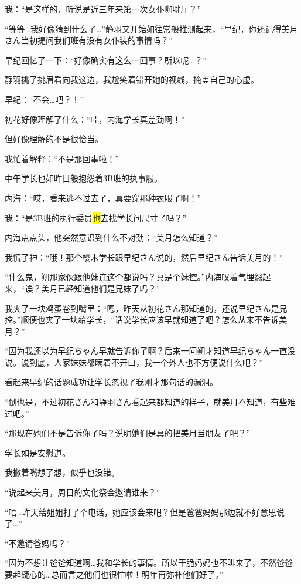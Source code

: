 我：“是这样的，听说是近三年来第一次女仆咖啡厅？”

“等等…我好像猜到什么了…”静羽又开始如往常般推测起来，“早纪，你还记得美月さん当初提问我们班有没有女仆装的事情吗？”

早纪回忆了一下：“好像确实有这么一回事？所以呢…？”

静羽挑了挑眉看向我这边，我尬笑着错开她的视线，掩盖自己的心虚。

早纪：“不会…吧？！”

初花好像理解了什么：“哇，内海学长真差劲啊！”

但好像理解的不是很恰当。

我忙着解释：“不是那回事啦！”

\cutlinef\food

中午学长也如昨日般抱怨着3B班的执事服。

内海：“哎，看来逃不过去了，真要穿那种衣服了啊！”

\newday{\food\cloudy}

我：“是3B班的执行委员\hl{也}去找学长问尺寸了吗？”

内海点点头，他突然意识到什么不对劲：“美月怎么知道？”

我慌了神：“哦！那个樱木学长跟早纪さん说的，然后早纪さん告诉美月的！”

“什么鬼，朔那家伙跟他妹连这个都说吗？真是个妹控。”内海叹着气埋怨起来，“诶？美月已经知道他们是兄妹了吗？”

我夹了一块鸡蛋卷到嘴里：“嗯，昨天从初花さん那知道的，还说早纪さん是兄控。”顺便也夹了一块给学长，“话说学长应该早就知道了吧？怎么从来不告诉美月？”

“因为我还以为早纪ちゃん早就告诉你了啊？后来一问朔才知道早纪ちゃん一直没说。说到底，人家妹妹都瞒着不开口，我一个外人也不方便说什么吧？”

看起来早纪的话题成功让学长忽视了我刚才那句话的漏洞。

“倒也是，不过初花さん和静羽さん看起来都知道的样子，就美月不知道，有些难过吧。”

“那现在她们不是告诉你了吗？说明她们是真的把美月当朋友了吧？”

学长如是安慰道。

我撇着嘴想了想，似乎也没错。

“说起来美月，周日的文化祭会邀请谁来？”

“唔…昨天给姐姐打了个电话，她应该会来吧？但是爸爸妈妈那边就不好意思说了…”

“不邀请爸妈吗？”

“因为不想让爸爸知道啊…我和学长的事情。所以干脆妈妈也不叫来了，不然爸爸要起疑心的…总而言之他们也很忙啦！明年再弥补他们好了。”


